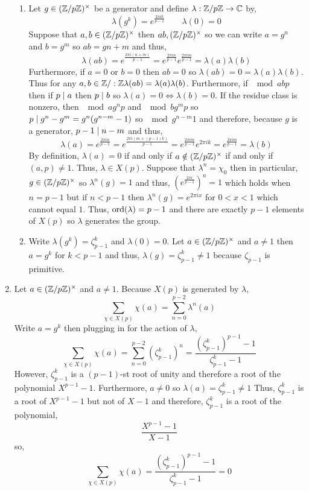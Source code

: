 \documentclass[12pt]{extarticle}
\begin{document}
\begin{enumerate}
\begin{enumerate}
\item Let $g \in (\mathbb{Z} / p \mathbb{Z})^\times$ be a generator and define $\lambda : \mathbb{Z} / p \mathbb{Z} \to \mathbb{C}$ by,
\[\lambda(g^k) = e^{\frac{2 \pi i k}{p-1}} \quad \quad \lambda(0) = 0\]
Suppose that $a,b \in (\mathbb{Z} / p \mathbb{Z})^\times$ then $ab, (\mathbb{Z} / p \mathbb{Z})^\times$ so we can write $a = g^n$ and $b = g^m$ so $ab = g{n+m}$ and thus, 
\[\lambda(ab) = e^{\frac{2 \pi i (n+m)}{p-1}} =  e^{\frac{2 \pi i n}{p-1}} e^{\frac{2 \pi i m}{p-1}} = \lambda(a) \lambda(b)\]
Furthermore, if $a = 0$ or $b = 0$ then $ab = 0$ so $\lambda(ab) = 0 = \lambda(a) \lambda(b)$. Thus for any $a,b \in \mathbb{Z} / : \mathbb{Z} \lambda(ab) = \lambda(a) \lambda(b)$. Furthermore, if $\mod{a}{b}{p}$ then if $p \mid a$ then $p \mid b$ so $\lambda(a) = 0 \iff \lambda(b) = 0$. If the residue class is nonzero, then $\mod{a}{g^n}{p}$ and $\mod{b}{g^m}{p}$ so $p \mid g^{n} - g^m = g^{n} ( g^{n-m} - 1)$ so $\mod{g^{n-m}}{1}$ and therefore, because $g$ is a generator, $p - 1 \mid n - m$ and thus, 
\[\lambda(a) = e^{\frac{2 \pi i n}{p - 1}} = e^{\frac{2 \pi i (m + (p - 1)k)}{p - 1}} = e^{\frac{2 \pi i m}{p - 1}} e^{2 \pi i k} = e^{\frac{2 \pi i m}{p - 1}} = \lambda(b)\] 
By definition, $\lambda(a) = 0$ if and only if $a \notin (\mathbb{Z} / p \mathbb{Z})^\times$ if and only if $(a, p) \neq 1$. Thus, $\lambda \in X(p)$. Suppose that $\lambda^n = \chi_0$ then in particular, $g \in (\mathbb{Z} / p \mathbb{Z})^\times$ so $\lambda^n(g) = 1$ and thus, $(e^{\frac{2 \pi i}{p-1}})^n = 1$ which holds when $n = p - 1$ but if $n < p - 1$ then $\lambda^n(g) = e^{2 \pi i x}$ for $0 < x < 1$ which cannot equal $1$. Thus, $\mathrm{ord}\! \left(\lambda \right) = p - 1$ and there are exactly $p - 1$ elements of $X(p)$ so $\lambda$ generates the group. 

\item Write $\lambda(g^k) = \zeta_{p-1}^k$ and $\lambda(0) = 0$. Let $a \in (\mathbb{Z} / p \mathbb{Z})^\times$ and $a \neq 1$ then $a = g^k$ for $k < p - 1$ and thus, $\lambda(g) = \zeta_{p-1}^k \neq 1$ because $\zeta_{p-1}$ is primitive. 

\end{enumerate}

\item Let $a \in (\mathbb{Z} / p \mathbb{Z})^\times$ and $a \neq 1$. Because $X(p)$ is generated by $\lambda$, 
\[ \sum\limits_{\chi \in X(p)} \chi(a) = \sum\limits_{n = 0}^{p - 2} \lambda^n(a)\]
Write $a = g^k$ then plugging in for the action of $\lambda$, 
\[\sum\limits_{\chi \in X(p)} \chi(a) = \sum\limits_{n = 0}^{p - 2} (\zeta_{p-1}^{k})^n = \frac{(\zeta_{p-1}^{k})^{p-1} - 1}{\zeta_{p-1}^{k} - 1}\]
However, $\zeta_{p-1}^{k}$ is a $(p-1)$-st root of unity and therefore a root of the polynomial $X^{p-1} - 1$. Furthermore, $a \neq 0$ so $\lambda(a) = \zeta_{p-1}^{k} \neq 1$ Thus, $\zeta_{p-1}^{k}$ is a root of  $X^{p-1} - 1$ but not of $X - 1$ and therefore, $\zeta_{p-1}^{k}$ is a root of the polynomial,
\[\frac{X^{p-1} - 1}{X - 1}\] 
so,
\[\sum\limits_{\chi \in X(p)} \chi(a) = \frac{(\zeta_{p-1}^{k})^{p-1} - 1}{\zeta_{p-1}^{k} - 1} = 0\] 


\end{enumerate}
\end{document}
